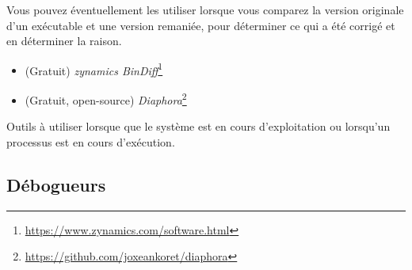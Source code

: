 Vous pouvez éventuellement les utiliser lorsque vous comparez la version originale d'un exécutable et une version remaniée, pour déterminer ce qui a été corrigé et en déterminer la raison.

\begin{itemize}
\item (Gratuit) \emph{zynamics BinDiff}\footnote{\url{https://www.zynamics.com/software.html}}

\item (Gratuit, open-source) \emph{Diaphora}\footnote{\url{https://github.com/joxeankoret/diaphora}}
\end{itemize}


Outils à utiliser lorsque que le système est en cours d'exploitation ou lorsqu'un processus est en cours d'exécution.

\subsection{Débogueurs}

\myindex{\olly}

